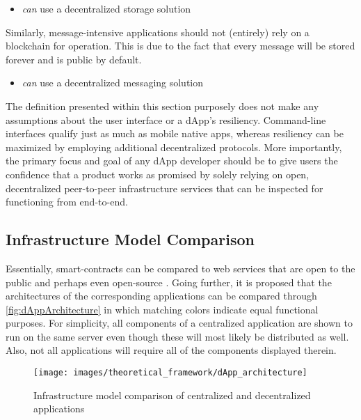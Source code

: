 \begin{description}[format={\storedescriptionlabel}]
	\begin{itemize}
		\item \textit{can} use a decentralized storage solution
	\end{itemize}
	
	Similarly, message-intensive applications should not (entirely) rely on a blockchain for operation. This is due to the fact that every message will be stored forever and is public by default. 
	
	\begin{itemize}
		\item \textit{can} use a decentralized messaging solution
	\end{itemize}
\end{description}

The definition presented within this section purposely does not make any assumptions about the user interface or a \ac{dApp}'s resiliency. Command-line interfaces qualify just as much as mobile native apps, whereas resiliency can be maximized by employing additional decentralized protocols. More importantly, the primary focus and goal of any \ac{dApp} developer should be to give users the confidence that a product works as promised by solely relying on open, decentralized peer-to-peer infrastructure services that can be inspected for functioning from end-to-end.

\subsection{Infrastructure Model Comparison}
Essentially, smart-contracts can be compared to web services that are open to the public and perhaps even open-source \cite[p.~120]{solidityDocs}. Going further, it is proposed that the architectures of the corresponding applications can be compared through \autoref{fig:dAppArchitecture} in which matching colors indicate equal functional purposes. For simplicity, all components of a centralized application are shown to run on the same server even though these will most likely be distributed as well. Also, not all applications will require all of the components displayed therein.

\begin{figure}[hbt]
	\centering
  	\texttt{[image: images/theoretical\_framework/dApp\_architecture]}
  	\caption{Infrastructure model comparison of centralized and decentralized applications}
  	\label{fig:dAppArchitecture}
\end{figure}

\FloatBarrier


